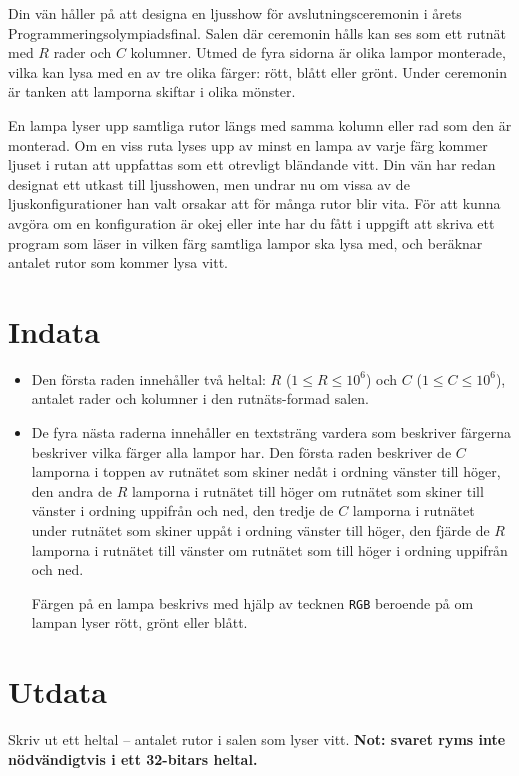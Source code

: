 Din vän håller på att designa en ljusshow för avslutningsceremonin i årets Programmeringsolympiadsfinal.
Salen där ceremonin hålls kan ses som ett rutnät med $R$ rader och $C$ kolumner.
Utmed de fyra sidorna är olika lampor monterade, vilka kan lysa med en av tre olika färger: rött, blått eller grönt.
Under ceremonin är tanken att lamporna skiftar i olika mönster.

En lampa lyser upp samtliga rutor längs med samma kolumn eller rad som den är monterad.
Om en viss ruta lyses upp av minst en lampa av varje färg kommer ljuset i rutan att uppfattas som ett otrevligt bländande vitt.
Din vän har redan designat ett utkast till ljusshowen, men undrar nu om vissa av de ljuskonfigurationer han valt orsakar att för många rutor blir vita.
För att kunna avgöra om en konfiguration är okej eller inte har du fått i uppgift att skriva ett program som läser in vilken färg samtliga lampor ska lysa med, och beräknar antalet rutor som kommer lysa vitt.

\section*{Indata}
\begin{itemize}
  \item
    Den första raden innehåller två heltal: $R$ ($1 \le R \le 10^6$) och $C$ ($1 \le C \le 10^6$), antalet rader och kolumner i den rutnäts-formad salen.

  \item
    De fyra nästa raderna innehåller en textsträng vardera som beskriver färgerna beskriver vilka färger alla lampor har.
    Den första raden beskriver de $C$ lamporna i toppen av rutnätet som skiner nedåt i ordning vänster till höger,
        den andra de $R$ lamporna i rutnätet till höger om rutnätet som skiner till vänster i ordning uppifrån och ned,
        den tredje de $C$ lamporna i rutnätet under rutnätet som skiner uppåt i ordning vänster till höger,
        den fjärde de $R$ lamporna i rutnätet till vänster om rutnätet som till höger i ordning uppifrån och ned.

    Färgen på en lampa beskrivs med hjälp av tecknen \texttt{RGB} beroende på om lampan lyser rött, grönt eller blått.
\end{itemize}

\section*{Utdata}
Skriv ut ett heltal -- antalet rutor i salen som lyser vitt.
\textbf{Not: svaret ryms inte nödvändigtvis i ett 32-bitars heltal.}

